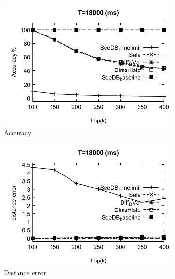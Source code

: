 \begin{figure}[t]
  \begin{subfigure}[b]{0.32\textwidth}
    \includegraphics[width=\textwidth]{tl3.pdf}
    \caption{Accuracy }
       \label{fig:tlfig3}
  \end{subfigure}
	\begin{subfigure}[b]{0.32\textwidth}
    \includegraphics[width=\textwidth]{tl31.pdf}
    \caption{Distance error}
       \label{fig:tlfig31}
  \end{subfigure}
  \begin{subfigure}[b]{0.32\textwidth}

\end{subfigure}
\end{figure}
